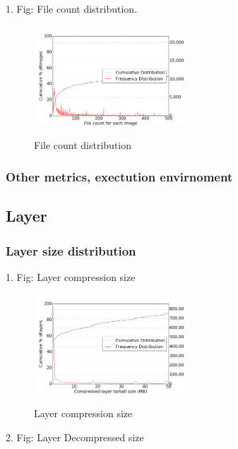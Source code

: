 1. Fig: File count distribution.

\begin{figure}
	\centering
	\includegraphics[width=0.5\textwidth]{graphs/File_count_for_each_image.png}\\
	\caption{File count distribution}\label{fig_image_size_compression}
\end{figure}

\subsubsection{Other metrics, exectution envirnoment}

\subsection{Layer}

\subsubsection{Layer size distribution}

1. Fig: Layer compression size

\begin{figure}
	\centering
	\includegraphics[width=0.5\textwidth]{graphs/Compressed_layer_tarball_size_(MB).png}\\
	\caption{Layer compression size}\label{fig_image_size_compression}
\end{figure}

2. Fig: Layer Decompressed size

